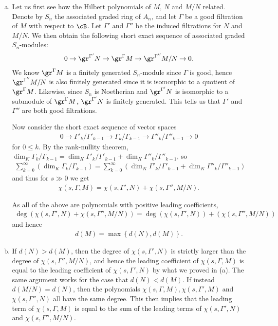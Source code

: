 \begin{prf}$ $
	\begin{enumerate}[(a)]
		\item Let us first see how the Hilbert polynomials of $M$, $N$ and $M/N$ related. Denote by $S_n$ the associated graded ring of $A_n$, and let $\Gamma$ be a good filtration of $M$ with respect to $\cB$. Let $\Gamma'$ and $\Gamma''$ be the induced filtrations for $N$ and $M/N$. We then obtain the following short exact sequence of associated graded $S_n$-modules:
		\begin{align*}
			0 \to \gr^{\Gamma'}N \to \gr^\Gamma M \to \gr^{\Gamma''}M/N \to 0.
		\end{align*}
		We know $\gr^\Gamma M$ is a finitely generated $S_n$-module since $\Gamma$ is good, hence $\gr^{\Gamma''}M/N$ is also finitely generated since it is isomorphic to a quotient of $\gr^\Gamma M$. Likewise, since $S_n$ is Noetherian and $\gr^{\Gamma'}N$ is isomorphic to a submodule of $\gr^\Gamma M$, $\gr^{\Gamma'}N$ is finitely generated. This tells us that $\Gamma'$ and $\Gamma''$ are both good filtrations.

		Now consider the short exact sequence of vector spaces
		\begin{align*}
			0 \to \Gamma'_k/\Gamma'_{k-1} \to \Gamma_k/\Gamma_{k-1} \to \Gamma''_{k}/\Gamma''_{k-1}\to 0
		\end{align*}
		for $0\leq k$. By the rank-nullity theorem, $\dim_K\Gamma_k/\Gamma_{k-1} = \dim_K\Gamma'_k/\Gamma'_{k-1} + \dim_K\Gamma''_{k}/\Gamma''_{k-1}$, so 
		\begin{align*}
			\sum_{k=0}^\infty\left(\dim_K\Gamma_k/\Gamma_{k-1}\right) = \sum_{k = 0}^\infty\left(\dim_K\Gamma'_k/\Gamma'_{k-1} + \dim_K\Gamma''_{k}/\Gamma''_{k-1}\right)
		\end{align*}
		and thus for $s \gg 0$ we get
		\begin{align*}
			\chi(s,\Gamma,M) = \chi(s,\Gamma',N) + \chi(s,\Gamma'', M/N).
		\end{align*}

		As all of the above are polynomials with positive leading coefficients,
		\begin{align*}
			\deg\left(\chi(s,\Gamma',N) + \chi(s,\Gamma'', M/N)\right) = \deg\left(\chi(s,\Gamma',N)\right) + \left(\chi(s,\Gamma'', M/N)\right)
		\end{align*}
		and hence
		\begin{align*}
			d(M) = \max\left\{d(N), d(M)\right\}.
		\end{align*}
		\item If $d(N)>d(M)$, then the degree of $\chi(s,\Gamma',N)$ is strictly larger than the degree of $\chi(s,\Gamma'',M/N)$, and hence the leading coefficient of $\chi(s,\Gamma,M)$ is equal to the leading coefficient of $\chi(s,\Gamma',N)$ by what we proved in (a). The same argument works for the case that $d(N) < d(M)$. If instead $d(M/N) = d(N)$, then the polynomials $\chi(s,\Gamma,M), \chi(s,\Gamma',M)$ and $\chi(s,\Gamma'', N)$ all have the same degree. This then implies that the leading term of $\chi(s,\Gamma, M)$ is equal to the sum of the leading terms of $\chi(s,\Gamma',N)$ and $\chi(s,\Gamma'',M/N)$.
	\end{enumerate}
\end{prf}
